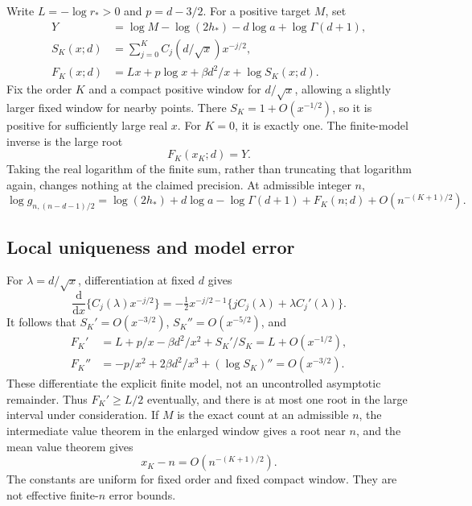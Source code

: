 \documentclass[11pt,letterpaper]{article}
\numberwithin{equation}{section}
\theoremstyle{definition}\newtheorem{definition}[theorem]{Definition}
\theoremstyle{remark}\newtheorem{remark}[theorem]{Remark}
\newcommand{\dd}{\mathrm d}
\newcommand{\Gnd}{g_{n,(n-d-1)/2}}
\begin{document}
Write $L=-\log r_*>0$ and $p=d-3/2$. For a positive target $M$, set
\begin{align}\label{gal:ep:eq:inversemodel}
Y&=\log M-\log(2h_*)-d\log a+\log\Gamma(d+1),\\
S_K(x;d)&=\sum_{j=0}^K C_j(d/\sqrt x)x^{-j/2},\nonumber\\
F_K(x;d)&=Lx+p\log x+\beta d^2/x+\log S_K(x;d).\nonumber
\end{align}
Fix the order $K$ and a compact positive window for $d/\sqrt x$, allowing a slightly larger fixed window for nearby points. There $S_K=1+O(x^{-1/2})$, so it is positive for sufficiently large real $x$. For $K=0$, it is exactly one. The finite-model inverse is the large root
\begin{equation}\label{gal:ep:eq:inverseroot}
F_K(x_K;d)=Y.
\end{equation}
Taking the real logarithm of the finite sum, rather than truncating that logarithm again, changes nothing at the claimed precision. At admissible integer $n$,
\begin{equation}\label{gal:ep:eq:logmodel}
\log\Gnd=\log(2h_*)+d\log a-\log\Gamma(d+1)
+F_K(n;d)+O(n^{-(K+1)/2}).
\end{equation}

\subsection{Local uniqueness and model error}
For $\lambda=d/\sqrt x$, differentiation at fixed $d$ gives
\[
\frac{\dd}{\dd x}\{C_j(\lambda)x^{-j/2}\}
=-\tfrac12x^{-j/2-1}\{jC_j(\lambda)+\lambda C_j'(\lambda)\}.
\]
It follows that $S_K'=O(x^{-3/2})$, $S_K''=O(x^{-5/2})$, and
\begin{align}\label{gal:ep:eq:inversederivatives}
F_K'&=L+p/x-\beta d^2/x^2+S_K'/S_K=L+O(x^{-1/2}),\\
F_K''&=-p/x^2+2\beta d^2/x^3+(\log S_K)''=O(x^{-3/2}).\nonumber
\end{align}
These differentiate the explicit finite model, not an uncontrolled asymptotic remainder. Thus $F_K'\ge L/2$ eventually, and there is at most one root in the large interval under consideration. If $M$ is the exact count at an admissible $n$, the intermediate value theorem in the enlarged window gives a root near $n$, and the mean value theorem gives
\begin{equation}\label{gal:ep:eq:inverseerror}
x_K-n=O(n^{-(K+1)/2}).
\end{equation}
The constants are uniform for fixed order and fixed compact window. They are not effective finite-$n$ error bounds.
\end{document}
